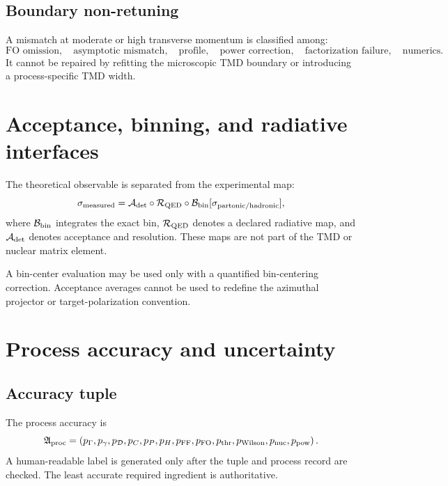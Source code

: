 \documentclass[11pt]{article}
\newcommand{\FF}{\mathrm{FF}}
\newcommand{\cR}{\mathcal R}
\newcommand{\cD}{\mathcal D}
\newcommand{\cA}{\mathcal A}
\newcommand{\cB}{\mathcal B}
\newcommand{\FO}{\mathrm{FO}}
\begin{document}
\subsection{Boundary non-retuning}

A mismatch at moderate or high transverse momentum is classified among:
\begin{equation}
 \text{FO omission},\quad
 \text{asymptotic mismatch},\quad
 \text{profile},\quad
 \text{power correction},\quad
 \text{factorization failure},\quad
 \text{numerics}.
 \label{eq:y-diagnostics}
\end{equation}
It cannot be repaired by refitting the microscopic TMD boundary or introducing a process-specific TMD width.

\section{Acceptance, binning, and radiative interfaces}
\label{sec:measurement-chain}

The theoretical observable is separated from the experimental map:
\begin{equation}
 \sigma_{\rm measured}
 =\cA_{\rm det}\circ\cR_{\rm QED}\circ\cB_{\rm bin}
 [\sigma_{\rm partonic/hadronic}],
 \label{eq:measurement-chain}
\end{equation}
where \(\cB_{\rm bin}\) integrates the exact bin, \(\cR_{\rm QED}\) denotes a declared radiative map, and \(\cA_{\rm det}\) denotes acceptance and resolution.  These maps are not part of the TMD or nuclear matrix element.

A bin-center evaluation may be used only with a quantified bin-centering correction.  Acceptance averages cannot be used to redefine the azimuthal projector or target-polarization convention.

\section{Process accuracy and uncertainty}
\label{sec:accuracy}

\subsection{Accuracy tuple}

The process accuracy is
\begin{equation}
 \mathfrak A_{\rm proc}=
 \left(
 p_\Gamma,p_\gamma,p_{\cD},p_C,p_P,p_H,p_{\FF},p_{\FO},
 p_{\rm thr},p_{\rm Wilson},p_{\rm nuc},p_{\rm pow}
 \right).
 \label{eq:accuracy-tuple}
\end{equation}
A human-readable label is generated only after the tuple and process record are checked.  The least accurate required ingredient is authoritative.
\end{document}
